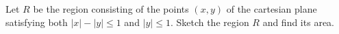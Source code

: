 Let $R$ be the region consisting of the points $(x,y)$ of the
cartesian plane satisfying both $|x|-|y| \leq 1$ and $|y| \leq 1$.
Sketch the region $R$ and find its area.
